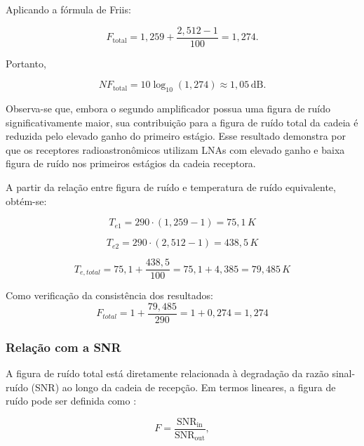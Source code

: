 Aplicando a fórmula de Friis:

\begin{equation}
F_{\mathrm{total}}
=
1,259
+
\frac{2,512-1}{100}
=
1,274.
\end{equation}

Portanto,

\begin{equation}
NF_{\mathrm{total}}
=
10\log_{10}(1,274)
\approx
1,05\,\mathrm{dB}.
\end{equation}

Observa-se que, embora o segundo amplificador possua uma figura de ruído significativamente maior, sua contribuição para a figura de ruído total da cadeia é reduzida pelo elevado ganho do primeiro estágio. Esse resultado demonstra por que os receptores radioastronômicos utilizam LNAs com elevado ganho e baixa figura de ruído nos primeiros estágios da cadeia receptora.

A partir da relação entre figura de ruído e temperatura de ruído equivalente, obtém-se:

\begin{equation}
  T_{e1} = 290 \cdot (1,259 - 1) = 75,1 \, K  
\end{equation}

\begin{equation}
    T_{e2} = 290 \cdot (2,512 - 1) = 438,5 \, K
\end{equation}

\begin{equation}
    T_{e,total} = 75,1 + \frac{438,5}{100} = 75,1 + 4,385 = 79,485 \, K
\end{equation}

Como verificação da consistência dos resultados:
\begin{equation}
F_{total} = 1 + \frac{79,485}{290} = 1 + 0,274 = 1,274 
\end{equation}   

\subsubsection{Relação com a SNR}

A figura de ruído total está diretamente relacionada à degradação da razão sinal-ruído (SNR) ao longo da cadeia de recepção. Em termos lineares, a figura de ruído pode ser definida como \cite{pozar2012microwave}:

\begin{equation}
F=
\frac{\mathrm{SNR}_{\mathrm{in}}}
{\mathrm{SNR}_{\mathrm{out}}},
\end{equation}

